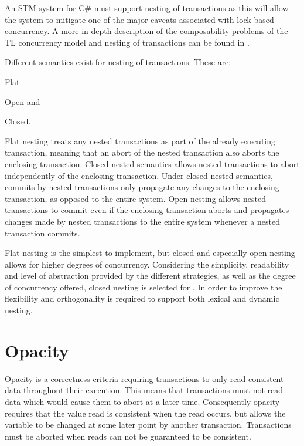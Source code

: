 An \ac{STM} system for C\# must support nesting of transactions as this will allow the system to mitigate one of the major caveats associated with lock based concurrency. A more in depth description of the composability problems of the \ac{TL} concurrency model and nesting of transactions can be found in \cite{dpt907e14trending}.

Different semantics exist for nesting of transactions. These are:  \begin{inparaenum}
\item Flat
\item Open and 
\item Closed\cite[p. 1]{kumar2011hparstm}\cite[p. 42]{harris2010transactional}.
\end{inparaenum}
Flat nesting treats any nested transactions as part of the already executing transaction, meaning that an abort of the nested transaction also aborts the enclosing transaction. Closed nested semantics allows nested transactions to abort independently of the enclosing transaction. Under closed nested semantics, commits by nested transactions only propagate any changes to the enclosing transaction, as opposed to the entire system. Open nesting allows nested transactions to commit even if the enclosing transaction aborts and propagates changes made by nested transactions to the entire system whenever a nested transaction commits.

Flat nesting is the simplest to implement, but closed and especially open nesting allows for higher degrees of concurrency\cite[p. 43]{harris2010transactional}. Considering the simplicity, readability and level of abstraction provided by the different strategies, as well as the degree of concurrency offered, closed nesting is selected for \stmnamesp. In order to improve the flexibility and orthogonality \stmnamesp is required to support both lexical and dynamic nesting.

\section{Opacity}
\label{sec:stm_req_opacity}
Opacity is a correctness criteria requiring transactions to only read consistent data throughout their execution\cite[p. 1]{guerraoui2007opacity}\cite[p. 29]{harris2010transactional}. This means that transactions must not read data which would cause them to abort at a later time. Consequently opacity requires that the value read is consistent when the read occurs, but allows the variable to be changed at some later point by another transaction. Transactions must be aborted when reads can not be guaranteed to be consistent.

